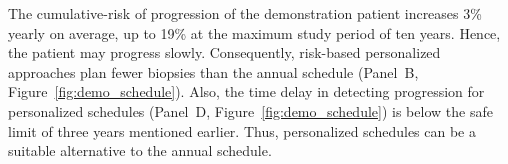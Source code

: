 The cumulative-risk of progression of the demonstration patient increases 3\% yearly on average, up to 19\% at the maximum study period of ten years. Hence, the patient may progress slowly. Consequently, risk-based personalized approaches plan fewer biopsies than the annual schedule (Panel~B, Figure~\ref{fig:demo_schedule}). Also, the time delay in detecting progression for personalized schedules (Panel~D, Figure~\ref{fig:demo_schedule}) is below the safe limit of three years mentioned earlier. Thus, personalized schedules can be a suitable alternative to the annual schedule.


